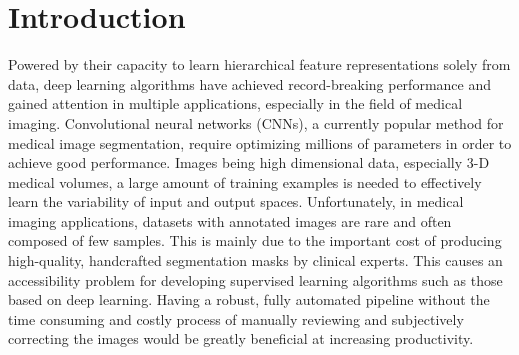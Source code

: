 \documentclass[preprint,12pt]{elsarticle}
\begin{document}
\section{Introduction}
\label{S:1}
Powered by their capacity to learn hierarchical feature representations solely from data, deep learning algorithms have achieved record-breaking performance and gained attention in multiple applications, especially in the field of medical imaging. Convolutional neural networks (CNNs), a currently popular method for medical image segmentation, require optimizing millions of parameters in order to achieve good performance. %
Images being high dimensional data, especially 3-D medical volumes, a large amount of training examples is needed to effectively learn the variability of input and output spaces. Unfortunately, in medical imaging applications, datasets with annotated images are rare and often composed of few samples. This is mainly due to the important cost of producing high-quality, handcrafted segmentation masks by clinical experts. This causes an accessibility problem for developing supervised learning algorithms such as those based on deep learning. Having a robust, fully automated pipeline without the time consuming and costly process of manually reviewing and subjectively correcting the images would be greatly beneficial at increasing productivity.

\end{document}

